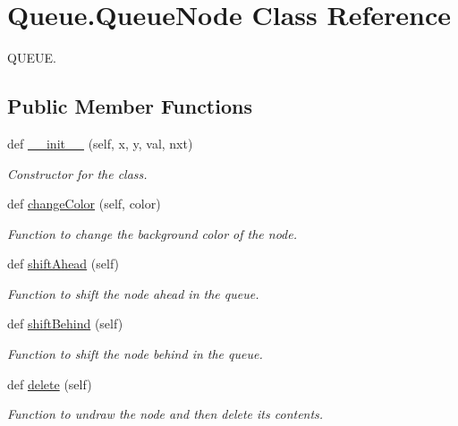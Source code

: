 \hypertarget{class_queue_1_1_queue_node}{}\section{Queue.\+Queue\+Node Class Reference}
\label{class_queue_1_1_queue_node}


Q\+U\+E\+UE.  


\subsection*{Public Member Functions}
\begin{DoxyCompactItemize}
\item 
def \hyperlink{class_queue_1_1_queue_node_acfe34780ae926af46ebe32a58c8e030c}{\+\_\+\+\_\+init\+\_\+\+\_\+} (self, x, y, val, nxt)
\begin{DoxyCompactList}\small\item\em Constructor for the class. \end{DoxyCompactList}\item 
def \hyperlink{class_queue_1_1_queue_node_a97a3e71ba6dddf6a6d40d4222402238b}{change\+Color} (self, color)
\begin{DoxyCompactList}\small\item\em Function to change the background color of the node. \end{DoxyCompactList}\item 
\mbox{\label{class_queue_1_1_queue_node_a71dbaccc8320cb100d14fcf8c8764c83}} 
def \hyperlink{class_queue_1_1_queue_node_a71dbaccc8320cb100d14fcf8c8764c83}{shift\+Ahead} (self)
\begin{DoxyCompactList}\small\item\em Function to shift the node ahead in the queue. \end{DoxyCompactList}\item 
\mbox{\label{class_queue_1_1_queue_node_ac4f2637c989e8d98c5bf20ce9481dce4}} 
def \hyperlink{class_queue_1_1_queue_node_ac4f2637c989e8d98c5bf20ce9481dce4}{shift\+Behind} (self)
\begin{DoxyCompactList}\small\item\em Function to shift the node behind in the queue. \end{DoxyCompactList}\item 
\mbox{\label{class_queue_1_1_queue_node_af50c356dd13964a0378e13034eec53ca}} 
def \hyperlink{class_queue_1_1_queue_node_af50c356dd13964a0378e13034eec53ca}{delete} (self)
\begin{DoxyCompactList}\small\item\em Function to undraw the node and then delete its contents. \end{DoxyCompactList}\end{DoxyCompactItemize}
